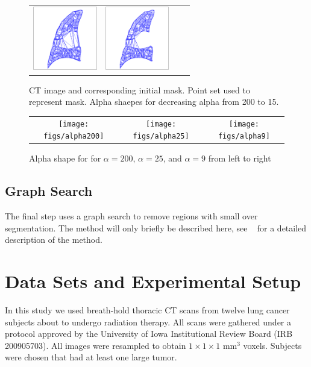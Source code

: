 \documentclass{llncs}
\begin{document}
\begin{figure}[t]
\begin{tabular}{cccc}
    \includegraphics[trim={150 100 150 100},clip,width=1.1in]{figs/tris_33} & 
    \includegraphics[trim={150 100 150 100},clip,width=1.1in]{figs/tris_15} \\
  \end{tabular}
  \caption{CT image and corresponding initial mask. Point set used to represent mask. Alpha shaepes for decreasing alpha from 200 to 15.}
  \label{fig:tris}
\end{figure}

\begin{figure}[t]
  \centering
  \begin{tabular}{ccc}
    \texttt{[image: figs/alpha200]} & 
    \texttt{[image: figs/alpha25]} & \texttt{[image: figs/alpha9]} \\
  \end{tabular}
  \caption{Alpha shape for for $\alpha=200$, $\alpha=25$, and $\alpha=9$ from left to right}
  \label{fig:alphashapes}
\end{figure}
%
\subsection{Graph Search}
%
The final step uses a graph search to remove regions with small over segmentation. The method will only briefly be described here, see ~\cite{li2006} for a detailed description of the method. 
%
\section{Data Sets and Experimental Setup}
%
In this study we used breath-hold thoracic CT scans from twelve lung cancer subjects about to undergo radiation therapy. All scans were gathered under a protocol approved by the University of Iowa Institutional Review Board (IRB 200905703). All images were resampled to obtain $1\times{}1\times{}1$ mm$^3$ voxels. Subjects were chosen that had at least one large tumor. 
\end{document}
